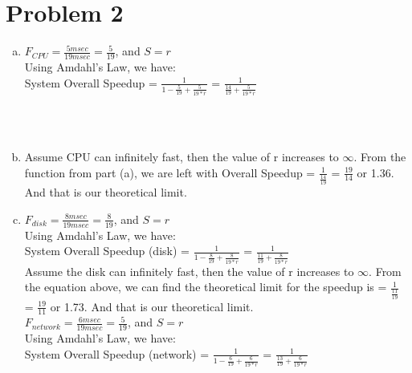 \documentclass{article}   	                         %
\begin{document}
\section*{Problem 2}
\begin{enumerate}[(a)]
\item
$F_{CPU} = \frac{5 msec}{19 msec} = \frac{5}{19} $, and $ S = r $ \\
Using Amdahl's Law, we have:\\
System Overall Speedup  = $ \frac{1}{1 - \frac{5}{19} + \frac{5}{19*r}} $ = $\frac{1}{\frac{14}{19} + \frac{5}{19*r}} $\\
\\
\\
\item
Assume CPU can infinitely fast, then the value of r increases to $\infty$. From the function from part (a), we are left with Overall Speedup = $\frac{1}{\frac{14}{19}}$  = $\frac{19}{14}$ or 1.36. And that is our theoretical limit.
\\ 
\item
$F_{disk} = \frac{8 msec}{19 msec} = \frac{8}{19} $, and $ S = r $ \\
Using Amdahl's Law, we have:\\
System Overall Speedup (disk)  = $ \frac{1}{1 - \frac{8}{19} + \frac{8}{19*r}} $ = $\frac{1}{\frac{11}{19} + \frac{8}{19*r}} $\\
Assume the disk can infinitely fast, then the value of r increases to $\infty$. From the equation above, we can find the theoretical limit for the speedup is = $\frac{1}{\frac{11}{19}}$  = $\frac{19}{11}$ or 1.73. And that is our theoretical limit.
\\
$F_{network} = \frac{6 msec}{19 msec} = \frac{5}{19} $, and $ S = r $ \\
Using Amdahl's Law, we have:\\
System Overall Speedup (network)  = $ \frac{1}{1 - \frac{6}{19} + \frac{6}{19*r}} $ = $\frac{1}{\frac{13}{19} + \frac{6}{19*r}} $\\

\end{enumerate}
\end{document}

